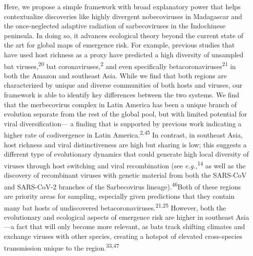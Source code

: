 \documentclass[10pt,oneside]{article}
\begin{document}
Here, we propose a simple framework with broad explanatory power that
helps contextualize discoveries like highly divergent nobecoviruses in
Madagascar and the once-neglected adaptive radiation of sarbecoviruses
in the Indochinese peninsula. In doing so, it advances ecological theory
beyond the current state of the art for global maps of emergence risk.
For example, previous studies that have used host richness as a proxy
have predicted a high diversity of unsampled bat
viruses,\textsuperscript{20} bat coronaviruses,\textsuperscript{2} and
even specifically betacoronaviruses\textsuperscript{21} in both the
Amazon and southeast Asia. While we find that both regions are
characterized by unique and diverse communities of both hosts and
viruses, our framework is able to identify key differences between the
two systems. We find that the merbecovirus complex in Latin America has
been a unique branch of evolution separate from the rest of the global
pool, but with limited potential for viral diversification--- a finding
that is supported by previous work indicating a higher rate of
codivergence in Latin America.\textsuperscript{2,45} In contrast, in
southeast Asia, host richness and viral distinctiveness are high but
sharing is low; this suggests a different type of evolutionary dynamics
that could generate high local diversity of viruses through host
switching and viral recombination (see \emph{e.g.},\textsuperscript{14}
as well as the discovery of recombinant viruses with genetic material
from both the SARS-CoV and SARS-CoV-2 branches of the Sarbecovirus
lineage).\textsuperscript{46}Both of these regions are priority areas
for sampling, especially given predictions that they contain many bat
hosts of undiscovered betacoronaviruses.\textsuperscript{21,25} However,
both the evolutionary and ecological aspects of emergence risk are
higher in southeast Asia---a fact that will only become more relevant,
as bats track shifting climates and exchange viruses with other species,
creating a hotspot of elevated cross-species transmission unique to the
region.\textsuperscript{33,47}
\end{document}

